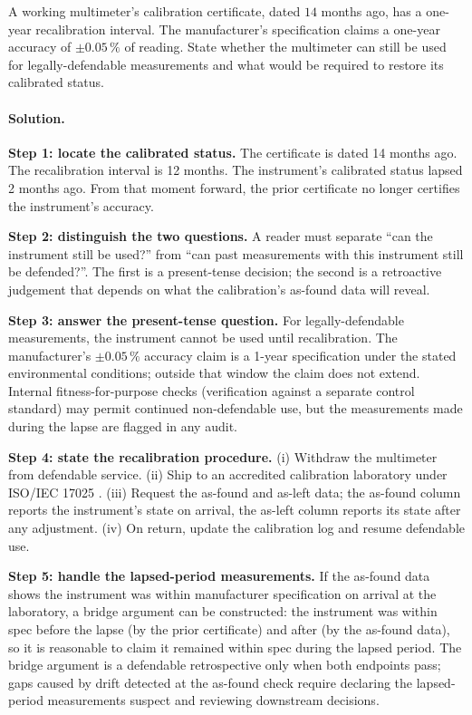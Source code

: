 \begin{exercise}
A working multimeter's calibration certificate, dated $14$ months
ago, has a one-year recalibration interval. The manufacturer's
specification claims a one-year accuracy of $\pm 0.05\,\%$ of
reading. State whether the multimeter can still be used for
legally-defendable measurements and what would be required to
restore its calibrated status.

\paragraph{Solution.}
\textbf{Step 1: locate the calibrated status.} The certificate is
dated 14 months ago. The recalibration interval is 12 months.
The instrument's calibrated status lapsed 2 months ago. From that
moment forward, the prior certificate no longer certifies the
instrument's accuracy.

\textbf{Step 2: distinguish the two questions.} A reader must
separate ``can the instrument still be used?'' from ``can past
measurements with this instrument still be defended?''. The first
is a present-tense decision; the second is a retroactive judgement
that depends on what the calibration's as-found data will reveal.

\textbf{Step 3: answer the present-tense question.} For
legally-defendable measurements, the instrument cannot be used
until recalibration. The manufacturer's $\pm 0.05\,\%$ accuracy
claim is a 1-year specification under the stated environmental
conditions; outside that window the claim does not extend. Internal
fitness-for-purpose checks (verification against a separate
control standard) may permit continued non-defendable use, but the
measurements made during the lapse are flagged in any audit.

\textbf{Step 4: state the recalibration procedure.} (i) Withdraw
the multimeter from defendable service. (ii) Ship to an accredited
calibration laboratory under ISO/IEC 17025 \cite{std:iso-iec-17025}. (iii) Request the as-found and as-left data; the as-found
column reports the instrument's state on arrival, the as-left
column reports its state after any adjustment. (iv) On return,
update the calibration log and resume defendable use.

\textbf{Step 5: handle the lapsed-period measurements.} If the
as-found data shows the instrument was within manufacturer
specification on arrival at the laboratory, a bridge argument can
be constructed: the instrument was within spec before the lapse
(by the prior certificate) and after (by the as-found data), so it
is reasonable to claim it remained within spec during the lapsed
period. The bridge argument is a defendable retrospective only when
both endpoints pass; gaps caused by drift detected at the as-found
check require declaring the lapsed-period measurements suspect and
reviewing downstream decisions.


\end{exercise}
